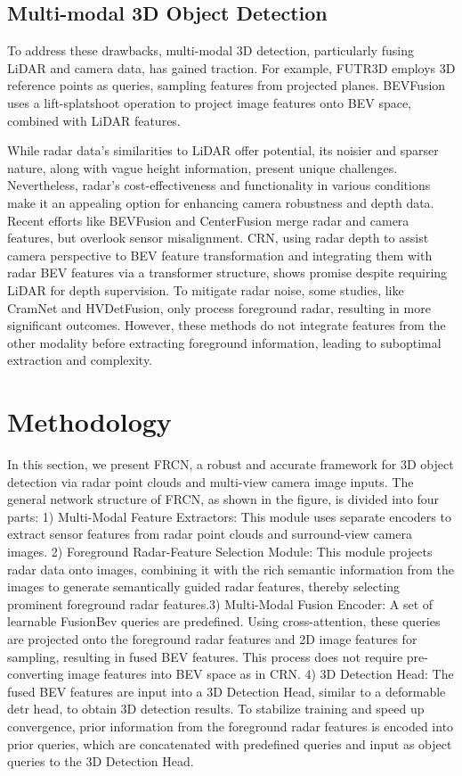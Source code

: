 \documentclass{article}
\begin{document}
\subsection{Multi-modal 3D Object Detection}
To address these drawbacks, multi-modal 3D detection, particularly fusing LiDAR and camera data, has gained traction. For example, FUTR3D employs 3D reference points as queries, sampling features from projected planes. BEVFusion uses a lift-splatshoot operation to project image features onto BEV space, combined with LiDAR features. 

While radar data's similarities to LiDAR offer potential, its noisier and sparser nature, along with vague height information, present unique challenges. Nevertheless, radar's cost-effectiveness and functionality in various conditions make it an appealing option for enhancing camera robustness and depth data. Recent efforts like BEVFusion and CenterFusion merge radar and camera features, but overlook sensor misalignment. CRN, using radar depth to assist camera perspective to BEV feature transformation and integrating them with radar BEV features via a transformer structure, shows promise despite requiring LiDAR for depth supervision. To mitigate radar noise, some studies, like CramNet and HVDetFusion, only process foreground radar, resulting in more significant outcomes. However, these methods do not integrate features from the other modality before extracting foreground information, leading to suboptimal extraction and complexity.



\section{Methodology}
In this section, we present FRCN, a robust and accurate framework for 3D object detection via radar point clouds and multi-view camera image inputs. The general network structure of FRCN, as shown in the figure, is divided into four parts: 1) Multi-Modal Feature Extractors: This module uses separate encoders to extract sensor features from radar point clouds and surround-view camera images. 2) Foreground Radar-Feature Selection Module: This module projects radar data onto images, combining it with the rich semantic information from the images to generate semantically guided radar features, thereby selecting prominent foreground radar features.3) Multi-Modal Fusion Encoder: A set of learnable FusionBev queries are predefined. Using cross-attention, these queries are projected onto the foreground radar features and 2D image features for sampling, resulting in fused BEV features. This process does not require pre-converting image features into BEV space as in CRN. 4) 3D Detection Head: The fused BEV features are input into a 3D Detection Head, similar to a deformable detr head, to obtain 3D detection results. To stabilize training and speed up convergence, prior information from the foreground radar features is encoded into prior queries, which are concatenated with predefined queries and input as object queries to the 3D Detection Head.
\end{document}
